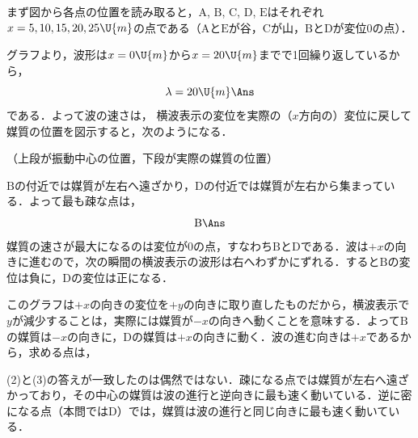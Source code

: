 \begin{reidaiunit}
\begin{kaitou}
\hspace{1zw}まず図から各点の位置を読み取ると，$\mathrm{A}$, $\mathrm{B}$, $\mathrm{C}$, $\mathrm{D}$, $\mathrm{E}$はそれぞれ$x=5, 10, 15, 20, 25\U{m}$の点である（$\mathrm{A}$と$\mathrm{E}$が谷，$\mathrm{C}$が山，$\mathrm{B}$と$\mathrm{D}$が変位0の点）．
\begin{komon}
 グラフより，波形は$x=0\U{m}$から$x=20\U{m}$までで1回繰り返しているから，
       \[\lambda=20\U{m}\Ans\]
       である．よって波の速さは，
 横波表示の変位を実際の（$x$方向の）変位に戻して媒質の位置を図示すると，次のようになる．
       \begin{center}\end{center}
       \hspace{1zw}（上段が振動中心の位置，下段が実際の媒質の位置）

       $\mathrm{B}$の付近では媒質が左右へ遠ざかり，$\mathrm{D}$の付近では媒質が左右から集まっている．よって最も疎な点は，
       \[\mathrm{B}\Ans\]
 媒質の速さが最大になるのは変位が0の点，すなわち$\mathrm{B}$と$\mathrm{D}$である．波は$+x$の向きに進むので，次の瞬間の横波表示の波形は右へわずかにずれる．すると$\mathrm{B}$の変位は負に，$\mathrm{D}$の変位は正になる．

       このグラフは{\gtfamily $+x$の向きの変位を$+y$の向きに取り直した}ものだから，横波表示で$y$が減少することは，実際には媒質が$-x$の向きへ動くことを意味する．よって$\mathrm{B}$の媒質は$-x$の向きに，$\mathrm{D}$の媒質は$+x$の向きに動く．波の進む向きは$+x$であるから，求める点は，
\end{komon}
\end{kaitou}
\begin{chuu}
(2)と(3)の答えが一致したのは偶然ではない．疎になる点では媒質が左右へ遠ざかっており，その中心の媒質は波の進行と逆向きに最も速く動いている．逆に密になる点（本問では$\mathrm{D}$）では，媒質は波の進行と同じ向きに最も速く動いている．
\end{chuu}
\end{reidaiunit}


